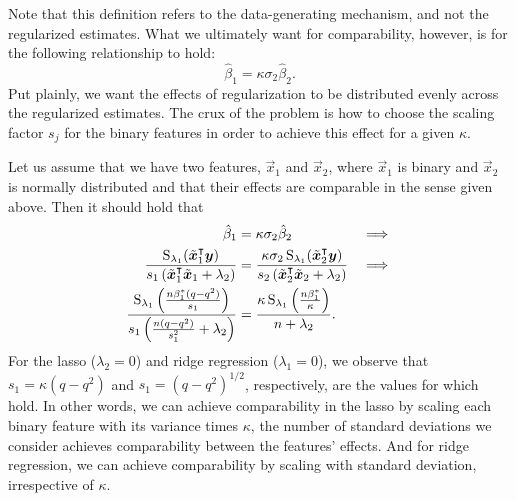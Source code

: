 Note that this definition refers to the data-generating mechanism, and not the regularized estimates.
What we ultimately want for comparability, however, is for the following relationship to hold:
\[
  \hat{\beta}_1 = \kappa \sigma_{2}\hat{\beta}_2.
\]
Put plainly, we want the effects of regularization to be distributed evenly across the regularized estimates.
The crux of the problem is how to choose the scaling factor \(s_j\) for the binary features in order to achieve this effect for a given \(\kappa\).

Let us assume that we have two features, \(\vec{x}_1\) and \(\vec{x}_2\), where \(\vec{x}_1\) is binary and \(\vec{x}_2\) is normally distributed and that their effects are comparable in the sense given above.
Then it should hold that
\begin{alignat}{3}
  \label{eq:comparable-effects}
  \hat{\beta}_1                                                                                                                          & = \kappa \sigma_2\hat{\beta}_2                                                                                                                           & \implies \nonumber \\
  \frac{\operatorname{S}_{\lambda_1}(\tilde{\boldsymbol{x}}_1^\intercal \boldsymbol{y})}{s_1\left(\tilde{\boldsymbol{x}}_1^\intercal \tilde{\boldsymbol{x}}_1 + \lambda_2\right)} & = \frac{\kappa \sigma_2 \operatorname{S}_{\lambda_1}(\tilde{\boldsymbol{x}}_2^\intercal \boldsymbol{y})}{s_2\left(\tilde{\boldsymbol{x}}_2^\intercal \tilde{\boldsymbol{x}}_2 + \lambda_2\right)} & \implies \nonumber \\
  \frac{\operatorname{S}_{\lambda_1}\left(\frac{n\beta_1^* (q - q^2)}{s_1}\right)}{s_1\left(\frac{n(q - q^2)}{s_1^2} + \lambda_2\right)}              & = \frac{\kappa \operatorname{S}_{\lambda_1}\left(\frac{n\beta_1^*}{\kappa} \right)}{n + \lambda_2}.
\end{alignat}
For the lasso (\(\lambda_2 = 0\)) and ridge regression (\(\lambda_1=0\)), we observe that \(s_1 = \kappa (q - q^2)\) and \(s_1 = (q - q^2)^{1/2}\), respectively, are the values for which  hold.
In other words, we can achieve comparability in the lasso by scaling each binary feature with its variance times \(\kappa\), the number of standard deviations we consider achieves comparability between the features' effects.
And for ridge regression, we can achieve comparability by scaling with standard deviation, irrespective of \(\kappa\).

